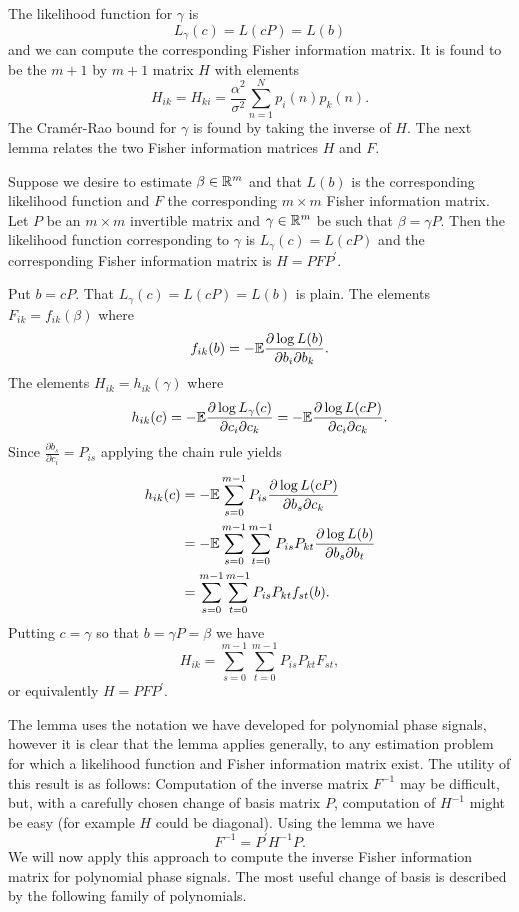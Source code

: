 \documentclass[journal,10pt]{IEEEtran}
\begin{document}
The likelihood function for $\gamma$ is 
\[
L_\gamma(c) = L(cP) = L(b)
\] 
and we can compute the corresponding Fisher information matrix.  It is found to be the $m+1$ by $m+1$ matrix $H$ with elements
\[
H_{ik} = H_{ki} = \frac{\alpha^2}{\sigma^2}\sum_{n=1}^{N} p_{i}(n) p_{k}(n).
\]
The Cram\'{e}r-Rao bound for $\gamma$ is found by taking the inverse of $H$.  The next lemma relates the two Fisher information matrices $H$ and $F$.

\begin{lemma}
Suppose we desire to estimate $\beta \in {\mathbb R}^m$ and that $L(b)$ is the corresponding likelihood function and $F$ the corresponding $m \times m$ Fisher information matrix.  Let $P$ be an $m \times m$ invertible matrix and $\gamma \in {\mathbb R}^m$ be such that $\beta = \gamma P$.  Then the likelihood function corresponding to $\gamma$ is $L_\gamma(c) = L(cP)$ and the corresponding Fisher information matrix is $H = P F P^\prime$. 
\end{lemma}
\begin{IEEEproof}
Put $b = cP$.  That $L_\gamma(c) = L(cP) = L(b)$ is plain.  The elements $F_{ik} = f_{ik}(\beta)$ where
\[
f_{ik}(b) = -{\mathbb E} \frac{\partial \log L(b)}{\partial b_i \partial b_k}.
\]
The elements $H_{ik} = h_{ik}(\gamma)$ where
\[
h_{ik}(c) = -{\mathbb E} \frac{\partial \log L_\gamma(c)}{\partial c_i \partial c_k} =  -{\mathbb E} \frac{\partial \log L(cP)}{\partial c_i \partial c_k}.
\]
Since $\frac{\partial b_s}{\partial c_i} = P_{is}$ applying the chain rule yields
\begin{align*}
h_{ik}(c) &= -{\mathbb E} \sum_{s=0}^{m-1} P_{is}\frac{\partial \log L(cP)}{\partial b_s \partial c_k} \\
&= -{\mathbb E} \sum_{s=0}^{m-1}\sum_{t=0}^{m-1} P_{is} P_{kt}   \frac{\partial \log L(b)}{\partial b_s \partial b_t} \\
&= \sum_{s=0}^{m-1}\sum_{t=0}^{m-1} P_{is} P_{kt}  f_{st}(b).
\end{align*}
Putting $c = \gamma$ so that $b = \gamma P = \beta$ we have
\[
H_{ik} = \sum_{s=0}^{m-1}\sum_{t=0}^{m-1} P_{is} P_{kt}  F_{st},
\]
or equivalently $H = P F P^\prime$.
\end{IEEEproof}

The lemma uses the notation we have developed for polynomial phase signals, however it is clear that the lemma applies generally, to any estimation problem for which a likelihood function and Fisher information matrix exist.  The utility of this result is as follows:  Computation of the inverse matrix $F^{-1}$ may be difficult, but, with a carefully chosen change of basis matrix $P$, computation of $H^{-1}$ might be easy (for example $H$ could be diagonal).  Using the lemma we have 
\[
F^{-1} = P^\prime H^{-1} P.
\]  
We will now apply this approach to compute the inverse Fisher information matrix for polynomial phase signals.  The most useful change of basis is described by the following family of polynomials.
\end{document}
